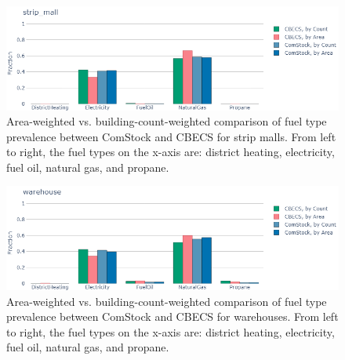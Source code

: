 \begin{figure}
  \centering
  \includegraphics[scale=0.5]{figures/cbecs_comstock_fuel_comparison_strip_mall.png}
  \caption[Comparison of fuel type prevalence between ComStock and CBECS for strip malls]{Area-weighted vs. building-count-weighted comparison of fuel type prevalence between ComStock and CBECS for strip malls. From left to right, the fuel types on the x-axis are: district heating, electricity, fuel oil, natural gas, and propane.}
  \label{fig:cbecs_comstock_fuel_comparison_strip_mall}
\end{figure}

\begin{figure}
  \centering
  \includegraphics[scale=0.5]{figures/cbecs_comstock_fuel_comparison_warehouse.png}
  \caption[Comparison of fuel type prevalence between ComStock and CBECS for warehouses]{Area-weighted vs. building-count-weighted comparison of fuel type prevalence between ComStock and CBECS for warehouses. From left to right, the fuel types on the x-axis are: district heating, electricity, fuel oil, natural gas, and propane.}
  \label{fig:cbecs_comstock_fuel_comparison_warehouse}
\end{figure}

